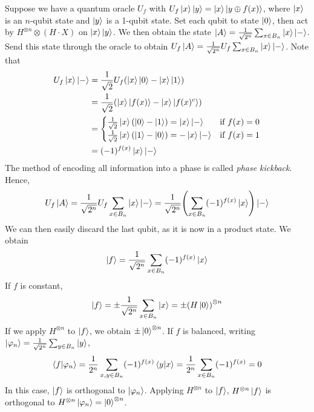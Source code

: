 Suppose we have a quantum oracle \( U_f \) with \( U_f \ket{x} \ket{y} = \ket{x} \ket{y \oplus f(x)} \), where \( \ket{x} \) is an \( n \)-qubit state and \( \ket{y} \) is a 1-qubit state.
Set each qubit to state \( \ket{0} \), then act by \( H^{\otimes n} \otimes (H \cdot X) \) on \( \ket{x} \ket{y} \).
We then obtain the state \( \ket{A} = \frac{1}{\sqrt{2^n}} \sum_{x \in B_n} \ket{x} \ket{-} \).
Send this state through the oracle to obtain \( U_f \ket{A} = \frac{1}{\sqrt{2^n}} U_f \sum_{x \in B_n} \ket{x} \ket{-} \).
Note that
\begin{align*}
    U_f \ket{x} \ket{-} &= \frac{1}{\sqrt{2}} U_f \qty(\ket{x}\ket{0} - \ket{x}\ket{1}) \\
    &= \frac{1}{\sqrt{2}} \qty(\ket{x}\ket{f(x)} - \ket{x}\ket{f(x)^c}) \\
    &= \begin{cases}
        \frac{1}{\sqrt{2}}\ket{x}(\ket{0} - \ket{1}) = \ket{x}\ket{-} & \text{if } f(x) = 0 \\
        \frac{1}{\sqrt{2}}\ket{x}(\ket{1} - \ket{0}) = -\ket{x}\ket{-} & \text{if } f(x) = 1
    \end{cases} \\
    &= (-1)^{f(x)} \ket{x}\ket{-}
\end{align*}
The method of encoding all information into a phase is called \emph{phase kickback}.
Hence,
\[ U_f \ket{A} = \frac{1}{\sqrt{2^n}} U_f \sum_{x \in B_n} \ket{x} \ket{-} = \frac{1}{\sqrt{2^n}} \qty(\sum_{x \in B_n} (-1)^{f(x)} \ket{x}) \ket{-} \]
We can then easily discard the last qubit, as it is now in a product state.
We obtain
\[ \ket{f} = \frac{1}{\sqrt{2^n}} \sum_{x \in B_n} (-1)^{f(x)} \ket{x} \]
If \( f \) is constant,
\[ \ket{f} = \pm \frac{1}{\sqrt{2^n}} \sum_{x \in B_n} \ket{x} = \pm \qty(H \ket{0})^{\otimes n} \]
If we apply \( H^{\otimes n} \) to \( \ket{f} \), we obtain \( \pm \ket{0}^{\otimes n} \).
If \( f \) is balanced, writing \( \ket{\varphi_n} = \frac{1}{\sqrt{2^n}} \sum_{y \in B_n} \ket{y} \),
\[ \ip{f}{\varphi_n} = \frac{1}{2^n} \sum_{x, y \in B_n} (-1)^{f(x)} \ip{y}{x} = \frac{1}{2^n} \sum_{x \in B_n} (-1)^{f(x)} = 0 \]
In this case, \( \ket{f} \) is orthogonal to \( \ket{\varphi_n} \).
Applying \( H^{\otimes n} \) to \( \ket{f} \), \( H^{\otimes n} \ket{f} \) is orthogonal to \( H^{\otimes n} \ket{\varphi_n} = \ket{0}^{\otimes n} \).

